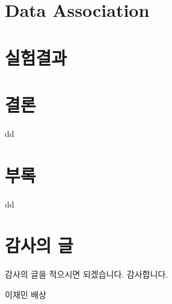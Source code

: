 \documentclass[master,korean,final]{cbnu-ecs}
\begin{document}
\chapter{Data Association}

\chapter{실험결과}

\chapter{결론}
dd

\chapter{부록}
dd


%
%
%

%
%
%


\chapter*{감사의 글}

감사의 글을 적으시면 되겠습니다.
감사합니다.

\begin{flushright}
\vspace{1cm}
이재민 배상
\end{flushright}
\end{document}
